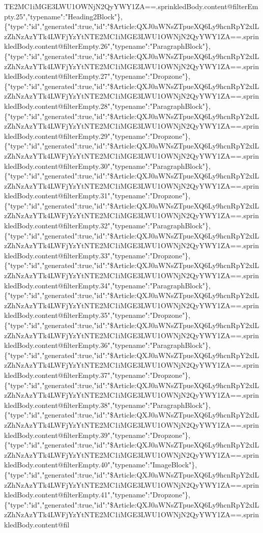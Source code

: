 TE2MC1iMGE3LWU1OWNjN2QyYWY1ZA==.sprinkledBody.content@filterEmpty.25","typename":"Heading2Block"\},\{"type":"id","generated":true,"id":"\$Article:QXJ0aWNsZTpueXQ6Ly9hcnRpY2xlLzZhNzAzYTk4LWFjYzYtNTE2MC1iMGE3LWU1OWNjN2QyYWY1ZA==.sprinkledBody.content@filterEmpty.26","typename":"ParagraphBlock"\},\{"type":"id","generated":true,"id":"\$Article:QXJ0aWNsZTpueXQ6Ly9hcnRpY2xlLzZhNzAzYTk4LWFjYzYtNTE2MC1iMGE3LWU1OWNjN2QyYWY1ZA==.sprinkledBody.content@filterEmpty.27","typename":"Dropzone"\},\{"type":"id","generated":true,"id":"\$Article:QXJ0aWNsZTpueXQ6Ly9hcnRpY2xlLzZhNzAzYTk4LWFjYzYtNTE2MC1iMGE3LWU1OWNjN2QyYWY1ZA==.sprinkledBody.content@filterEmpty.28","typename":"ParagraphBlock"\},\{"type":"id","generated":true,"id":"\$Article:QXJ0aWNsZTpueXQ6Ly9hcnRpY2xlLzZhNzAzYTk4LWFjYzYtNTE2MC1iMGE3LWU1OWNjN2QyYWY1ZA==.sprinkledBody.content@filterEmpty.29","typename":"Dropzone"\},\{"type":"id","generated":true,"id":"\$Article:QXJ0aWNsZTpueXQ6Ly9hcnRpY2xlLzZhNzAzYTk4LWFjYzYtNTE2MC1iMGE3LWU1OWNjN2QyYWY1ZA==.sprinkledBody.content@filterEmpty.30","typename":"ParagraphBlock"\},\{"type":"id","generated":true,"id":"\$Article:QXJ0aWNsZTpueXQ6Ly9hcnRpY2xlLzZhNzAzYTk4LWFjYzYtNTE2MC1iMGE3LWU1OWNjN2QyYWY1ZA==.sprinkledBody.content@filterEmpty.31","typename":"Dropzone"\},\{"type":"id","generated":true,"id":"\$Article:QXJ0aWNsZTpueXQ6Ly9hcnRpY2xlLzZhNzAzYTk4LWFjYzYtNTE2MC1iMGE3LWU1OWNjN2QyYWY1ZA==.sprinkledBody.content@filterEmpty.32","typename":"ParagraphBlock"\},\{"type":"id","generated":true,"id":"\$Article:QXJ0aWNsZTpueXQ6Ly9hcnRpY2xlLzZhNzAzYTk4LWFjYzYtNTE2MC1iMGE3LWU1OWNjN2QyYWY1ZA==.sprinkledBody.content@filterEmpty.33","typename":"Dropzone"\},\{"type":"id","generated":true,"id":"\$Article:QXJ0aWNsZTpueXQ6Ly9hcnRpY2xlLzZhNzAzYTk4LWFjYzYtNTE2MC1iMGE3LWU1OWNjN2QyYWY1ZA==.sprinkledBody.content@filterEmpty.34","typename":"ParagraphBlock"\},\{"type":"id","generated":true,"id":"\$Article:QXJ0aWNsZTpueXQ6Ly9hcnRpY2xlLzZhNzAzYTk4LWFjYzYtNTE2MC1iMGE3LWU1OWNjN2QyYWY1ZA==.sprinkledBody.content@filterEmpty.35","typename":"Dropzone"\},\{"type":"id","generated":true,"id":"\$Article:QXJ0aWNsZTpueXQ6Ly9hcnRpY2xlLzZhNzAzYTk4LWFjYzYtNTE2MC1iMGE3LWU1OWNjN2QyYWY1ZA==.sprinkledBody.content@filterEmpty.36","typename":"ParagraphBlock"\},\{"type":"id","generated":true,"id":"\$Article:QXJ0aWNsZTpueXQ6Ly9hcnRpY2xlLzZhNzAzYTk4LWFjYzYtNTE2MC1iMGE3LWU1OWNjN2QyYWY1ZA==.sprinkledBody.content@filterEmpty.37","typename":"Dropzone"\},\{"type":"id","generated":true,"id":"\$Article:QXJ0aWNsZTpueXQ6Ly9hcnRpY2xlLzZhNzAzYTk4LWFjYzYtNTE2MC1iMGE3LWU1OWNjN2QyYWY1ZA==.sprinkledBody.content@filterEmpty.38","typename":"ParagraphBlock"\},\{"type":"id","generated":true,"id":"\$Article:QXJ0aWNsZTpueXQ6Ly9hcnRpY2xlLzZhNzAzYTk4LWFjYzYtNTE2MC1iMGE3LWU1OWNjN2QyYWY1ZA==.sprinkledBody.content@filterEmpty.39","typename":"Dropzone"\},\{"type":"id","generated":true,"id":"\$Article:QXJ0aWNsZTpueXQ6Ly9hcnRpY2xlLzZhNzAzYTk4LWFjYzYtNTE2MC1iMGE3LWU1OWNjN2QyYWY1ZA==.sprinkledBody.content@filterEmpty.40","typename":"ImageBlock"\},\{"type":"id","generated":true,"id":"\$Article:QXJ0aWNsZTpueXQ6Ly9hcnRpY2xlLzZhNzAzYTk4LWFjYzYtNTE2MC1iMGE3LWU1OWNjN2QyYWY1ZA==.sprinkledBody.content@filterEmpty.41","typename":"Dropzone"\},\{"type":"id","generated":true,"id":"\$Article:QXJ0aWNsZTpueXQ6Ly9hcnRpY2xlLzZhNzAzYTk4LWFjYzYtNTE2MC1iMGE3LWU1OWNjN2QyYWY1ZA==.sprinkledBody.content@fil
